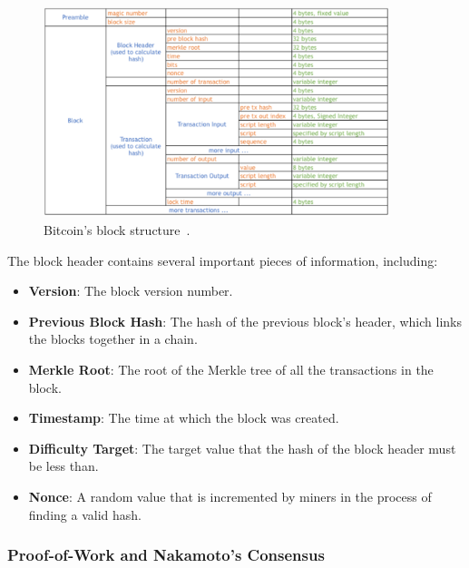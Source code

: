 \begin{figure}[t]
	\begin{center}
		\includegraphics[width=0.9\textwidth]{./figs/block-structructure.png}
		\caption{Bitcoin's block structure~.}		
		\label{fig:block-structure}
	\end{center}	
\end{figure}

The block header contains several important pieces of information,
including:

\begin{itemize}
	\tightlist
	\item
	\textbf{Version}: The block version number.
	\item
	\textbf{Previous Block Hash}: The hash of the previous block's header,
	which links the blocks together in a chain.
	\item
	\textbf{Merkle Root}: The root of the Merkle tree of all the
	transactions in the block.
	\item
	\textbf{Timestamp}: The time at which the block was created.
	\item
	\textbf{Difficulty Target}: The target value that the hash of the
	block header must be less than.
	\item
	\textbf{Nonce}: A random value that is incremented by miners in the
	process of finding a valid hash.
\end{itemize}

\subsubsection{Proof-of-Work and Nakamoto's
	Consensus}\label{proof-of-work-and-nakamotos-consensus}

